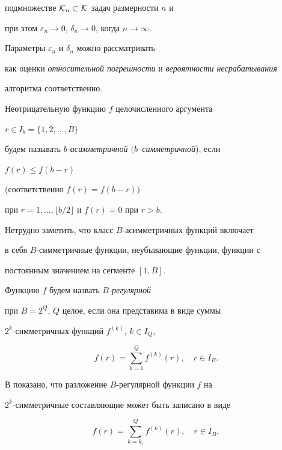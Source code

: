 подмножестве ${\cal K}_{n}\subset{\cal K}$ задач размерности $n$ и


при этом $\varepsilon_{n}\to 0$, $\delta_{n}\to 0$, когда $n\to \infty$.


	


Параметры $\varepsilon_{n}$ и $\delta_{n}$ можно рассматривать 


как оценки {\em относительной погрешности} и {\em вероятности несрабатывания}


алгоритма соответственно.





Неотрицательную функцию $f$ целочисленного аргумента 


$r \in I_{b}=\{1,2,\dotsc,B\}$


будем называть {\em $b$-асимметричной $(b$--симметричной}), если


$f(r)\le f(b-r)$


(соответственно $f(r)=f(b-r))$


при $r=1,\dotsc,\lfloor b/2 \rfloor$ и $f(r)=0$ при $r>b$.





Нетрудно заметить, что класс $B$-асимметричных функций включает 


в себя $B$-симметричные функции, неубывающие функции, функции с


постоянным значением на сегменте $[1,B]$.


 


Функцию $f$ будем назвать {\em $B$-регулярной}


при $B=2^{Q}$, $Q$ целое, если она представима в виде суммы


$2^{k}$-симметричных функций $f^{(k)}$, $k \in I_{Q}$,


$$


f(r)=\sum_{k=1}^{Q} f^{(k)}(r),\quad r \in I_{B}.


$$





В \cite{GZ} показано, что разложение $B$-регулярной функции $f$ на


$2^{k}$-симметричные составляющие может быть записано в виде


$$


f(r)=\sum_{k=k_{r}}^{Q} f^{(k)}(r),\quad r \in I_{B},


$$


